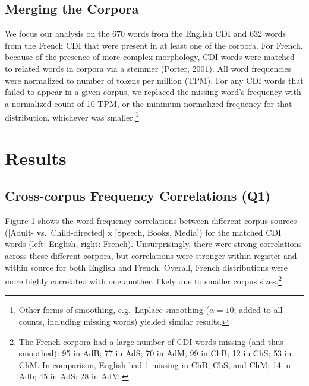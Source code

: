 \documentclass[10pt, letterpaper]{article}
\begin{document}
\hypertarget{merging-the-corpora}{%
\subsection{Merging the Corpora}\label{merging-the-corpora}}

We focus our analysis on the 670 words from the English CDI and 632
words from the French CDI that were present in at least one of the
corpora. For French, because of the presence of more complex morphology,
CDI words were matched to related words in corpora via a stemmer
(Porter, 2001). All word frequencies were normalized to number of tokens
per million (TPM). For any CDI words that failed to appear in a given
corpus, we replaced the missing word's frequency with a normalized count
of 10 TPM, or the minimum normalized frequency for that distribution,
whichever was smaller.\footnote{Other forms of smoothing, e.g.~Laplace
  smoothing (\(\alpha=10\); added to all counts, including missing
  words) yielded similar results.}

\hypertarget{results}{%
\section{Results}\label{results}}

\hypertarget{cross-corpus-frequency-correlations-q1}{%
\subsection{Cross-corpus Frequency Correlations
(Q1)}\label{cross-corpus-frequency-correlations-q1}}

Figure 1 shows the word frequency correlations between different corpus
sources ({[}Adult- vs.~Child-directed{]} x {[}Speech, Books, Media{]})
for the matched CDI words (left: English, right: French).
Unsurprisingly, there were strong correlations across these different
corpora, but correlations were stronger within register and within
source for both English and French. Overall, French distributions were
more highly correlated with one another, likely due to smaller corpus
sizes.\footnote{The French corpora had a large number of CDI words
  missing (and thus smoothed): 95 in AdB; 77 in AdS; 70 in AdM; 99 in
  ChB; 12 in ChS; 53 in ChM. In comparison, English had 1 missing in
  ChB, ChS, and ChM; 14 in Adb; 45 in AdS; 28 in AdM.}
\end{document}

